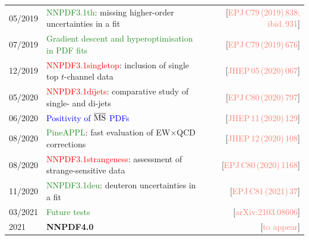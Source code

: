 \documentclass[aspectratio=169,10pt]{beamer}
\begin{document}
\begin{frame}
\begin{tabularx}{\textwidth}{lXr}
  05/2019 & \textcolor{forestgreen}{NNPDF3.1th}: {\scriptsize missing higher-order uncertainties in a fit}                                         
          & {\tiny{[{\textcolor{salmon}{EPJ\,C79\,(2019)\,838; ibid.\,931}}]}}\\
  07/2019 & \textcolor{forestgreen}{Gradient descent and hyperoptimisation in PDF fits} 
          & {\tiny{[{\textcolor{salmon}{EPJ\,C79\,(2019)\,676}}]}}\\
  12/2019 & \textcolor{red}{NNPDF3.1singletop}: {\scriptsize inclusion of single top $t$-channel data}                                          
          & {\tiny{[{\textcolor{salmon}{JHEP\,05\,(2020)\,067}}]}}\\
  05/2020 & \textcolor{red}{NNPDF3.1dijets}: {\scriptsize comparative study of single- and di-jets}                                             
          & {\tiny{[{\textcolor{salmon}{EPJ\,C80\,(2020)\,797}}]}}\\
  06/2020 & \textcolor{blue}{Positivity of $\overline{\rm MS}$ PDFs}                    
          & {\tiny{[{\textcolor{salmon}{JHEP\,11\,(2020)\,129}}]}}\\
  08/2020 & \textcolor{forestgreen}{PineAPPL}: {\scriptsize fast evaluation of EW$\times$QCD corrections}                                           
          & {\tiny{[{\textcolor{salmon}{JHEP\,12\,(2020)\,108}}]}}\\
  08/2020 & \textcolor{red}{NNPDF3.1strangeness}: {\scriptsize assessment of strange-sensitive data}                                        
          & {\tiny{[{\textcolor{salmon}{EPJ\,C80\,(2020)\,1168}}]}}\\
  11/2020 & \textcolor{forestgreen}{NNPDF3.1deu}: {\scriptsize deuteron uncertainties in a fit}                                        
          & {\tiny{[{\textcolor{salmon}{EPJ\,C81\,(2021)\,37}}]}}\\
  03/2021 & \textcolor{forestgreen}{Future tests}                                       
          & {\tiny{[{\textcolor{salmon}{arXiv:2103.08606}}]}}\\
  2021    & {\bf NNPDF4.0}                                                              
          & {\tiny{[{\textcolor{salmon}{to appear}}]}}\\
 \end{tabularx}
\end{frame}


\end{document}
